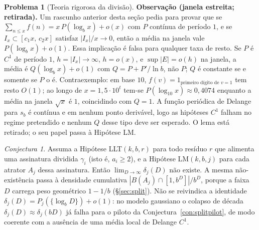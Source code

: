 \documentclass[11pt]{article}
\theoremstyle{definition}
\newtheorem{problem}[theorem]{Problema}
\theoremstyle{remark}
\newtheorem{conjecture}[theorem]{Conjectura}
\begin{document}
\begin{problem}[Teoria rigorosa da divisão]
\medskip\noindent\textbf{Observação (janela estreita; retirada).} Um rascunho anterior desta seção pedia para provar que se $\sum_{n\le x}f(n)=x\,P(\log_b x)+o(x)$ com $P$ contínua de período $1$, e se $I_x\subset[c_1 x,\,c_2 x]$ satisfaz $|I_x|/x\to 0$, então a média na janela vale $P(\log_b x)+o(1)$. Essa implicação é falsa para qualquer taxa de resto. Se $P$ é $C^1$ de período $1$, $h=|I_x|\to\infty$, $h=o(x)$, e $\sup|E|=o(h)$ na janela, a média é $Q(\log_b x)+o(1)$ com $Q=P+P'/\ln b$, não $P$; $Q$ é constante se e somente se $P$ o é. Contraexemplo: em base $10$, $f(v)=1_{\text{primeiro dígito de }v=1}$ tem resto $O(1)$; ao longo de $x=1{,}5\cdot 10^t$ tem-se $P(\log_{10}x)\approx 0{,}4074$ enquanto a média na janela $\sqrt{x}$ é $1$, coincidindo com $Q=1$. A função periódica de Delange para $s_b$ é contínua e em nenhum ponto derivável, logo as hipóteses $C^1$ falham no regime pretendido e nenhum $Q$ desse tipo deve ser esperado. O lema está retirado; o seu papel passa à Hipótese LM.
\end{problem}

\begin{conjecture}\label{con:split}
Assuma a Hipótese LLT$(k,b,r)$ para todo resíduo $r$ que alimenta uma assinatura dividida $\gamma_i$ (isto é, $a_i\ge 2$), e a Hipótese LM$(k,b,j)$ para cada atrator $A_j$ dessa assinatura. Então $\lim_{D\to\infty}\delta_j(D)$ não existe. A mesma não-existência passa à densidade cumulativa $|B(A_j)\cap[1,b^D]|/b^D$, porque a faixa $D$ carrega peso geométrico $1-1/b$ (\S\ref{sec:split}). Não se reivindica a identidade $\delta_j(D)=P_j(\{\log_b D\})+o(1)$: no modelo gaussiano o colapso de década $\delta_j(D)\approx\delta_j(bD)$ já falha para o piloto da Conjectura~\ref{con:splitpilot}, de modo coerente com a ausência de uma média local de Delange $C^1$.
\end{conjecture}
\end{document}
